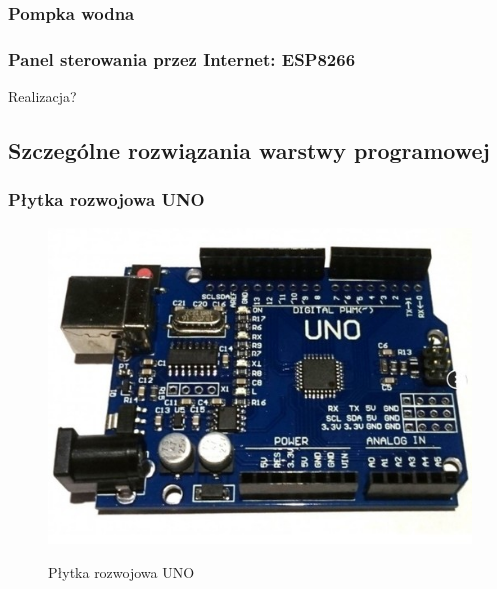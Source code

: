 \documentclass[12pt]{article}
\begin{document}
\subsubsection{Pompka wodna}


\subsubsection{Panel sterowania przez Internet: ESP8266}
Realizacja?

\subsection{Szczególne rozwiązania warstwy programowej}
\subsubsection{Płytka rozwojowa UNO}
\begin{figure}[!h]
	\begin{center}
		{\includegraphics[width=12cm]{uno_photo.png}}
	\end{center}
	\caption{Płytka rozwojowa UNO}
\end{figure}
\end{document}
